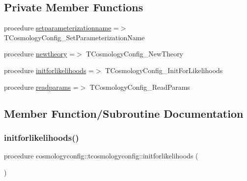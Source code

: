 \subsection*{Private Member Functions}
\begin{DoxyCompactItemize}
\item 
procedure \mbox{\hyperlink{structcosmologyconfig_1_1tcosmologyconfig_a9f3d5c3dff9c2714e1b48e9ae05bd0a2}{setparameterizationname}} =$>$ T\+Cosmology\+Config\+\_\+\+Set\+Parameterization\+Name
\item 
procedure \mbox{\hyperlink{structcosmologyconfig_1_1tcosmologyconfig_a0a8fdf6fb51704f8c8915c8370f885b8}{newtheory}} =$>$ T\+Cosmology\+Config\+\_\+\+New\+Theory
\item 
procedure \mbox{\hyperlink{structcosmologyconfig_1_1tcosmologyconfig_a5fbb1d82b47d22b3102ece7a2ed17d3a}{initforlikelihoods}} =$>$ T\+Cosmology\+Config\+\_\+\+Init\+For\+Likelihoods
\item 
procedure \mbox{\hyperlink{structcosmologyconfig_1_1tcosmologyconfig_acf7288501c5ffacddd9f7f3f6f913d85}{readparams}} =$>$ T\+Cosmology\+Config\+\_\+\+Read\+Params
\end{DoxyCompactItemize}


\subsection{Member Function/\+Subroutine Documentation}
\mbox{\label{structcosmologyconfig_1_1tcosmologyconfig_a5fbb1d82b47d22b3102ece7a2ed17d3a}} 
\subsubsection{\texorpdfstring{initforlikelihoods()}{initforlikelihoods()}}
{\footnotesize\ttfamily procedure cosmologyconfig\+::tcosmologyconfig\+::initforlikelihoods (\begin{DoxyParamCaption}{ }\end{DoxyParamCaption})\hspace{0.3cm}{\ttfamily [private]}}

\mbox{\label{structcosmologyconfig_1_1tcosmologyconfig_a0a8fdf6fb51704f8c8915c8370f885b8}} 

